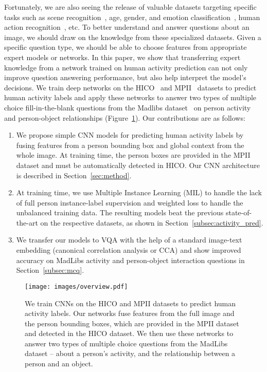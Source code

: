 \documentclass[runningheads]{llncs}
\begin{document}
Fortunately, we are also seeing the release of valuable datasets targeting specific tasks such as scene recognition~\cite{zhou2014learning}, age, gender, and emotion classification~\cite{levi2015age,levi2015emotion}, human action recognition~\cite{maji2011action,chao2015hico,pishchulin2014fine}, etc. To better understand and answer questions about an image, we should draw on the knowledge from these specialized datasets. Given a specific question type, we should be able to choose features from appropriate expert models or networks. 
In this paper, we show that transferring expert knowledge from a network trained on human activity prediction can not only improve question answering performance, but also help interpret the model's decisions. We train deep networks on the HICO~\cite{chao2015hico} and MPII~\cite{pishchulin2014fine} datasets to predict human activity labels and apply these networks to answer two types of multiple choice fill-in-the-blank questions from the Madlibs dataset~\cite{yu2015visual} on person activity and person-object relationships (Figure~\ref{fig:overview}). Our contributions are as follows:
\begin{enumerate}
\item We propose simple CNN models for predicting human activity labels by fusing features from a person bounding box and global context from the whole image. At training time, the person boxes are provided in the MPII dataset and must be automatically detected in HICO. Our CNN architecture is described in Section~\ref{sec:method}. 
\item At training time, we use Multiple Instance Learning (MIL) to handle the lack of full person instance-label supervision and weighted loss to handle the unbalanced training data. The resulting models beat the previous state-of-the-art on the respective datasets, as shown in Section~\ref{subsec:activity_pred}.
\item We transfer our models to VQA with the help of a standard image-text embedding (canonical correlation analysis or CCA) and show improved accuracy on MadLibs activity and person-object interaction questions in Section~\ref{subsec:mcq}.
\end{enumerate}\vspace{-5mm}\begin{figure}[h!]
    \centering
    \texttt{[image: images/overview.pdf]}
    \caption{We train CNNs on the HICO and MPII datasets to predict human activity labels. Our networks fuse features from the full image and the person bounding boxes, which are provided in the MPII dataset and detected in the HICO dataset. 
    We then use these networks to answer two types of multiple choice questions from the MadLibs dataset -- about a person's activity, and the relationship between a person and an object.}
    \label{fig:overview}
\end{figure}%
\end{document}
